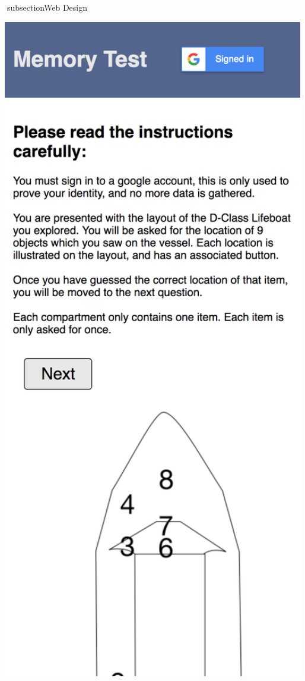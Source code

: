 \documentclass[ %
                    author={Elis Jones},
                supervisor={Dr. Kirsten Cater},
                    degree={BSc},
                     title={The Effect of Presentation Medium on Spatial Cognition},
                  subtitle={in the Virtual Environment},
                      year={2018} ]{dissertation}
\begin{document}
\ subsection{Web Design}


\begin{center}
    \centering
    \begin{minipage}{0.3\textwidth}
        \centering
        \includegraphics[width=1\textwidth]{images/web-intro.png}

\end{minipage}
\end{center}
\end{document}

